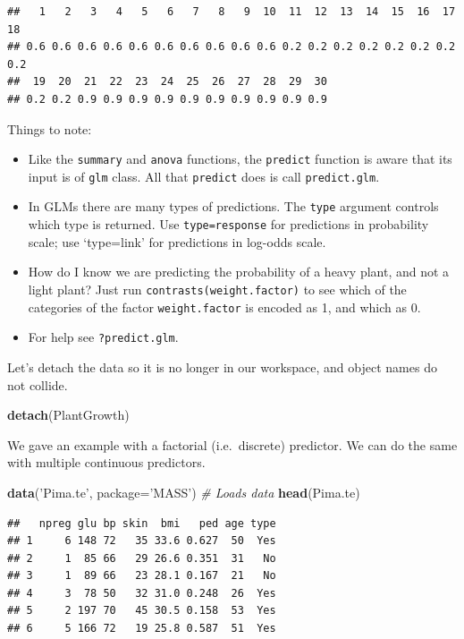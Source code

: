 \documentclass[]{book}
\newenvironment{Shaded}{\begin{snugshade}}{\end{snugshade}}
\newcommand{\KeywordTok}[1]{\textcolor[rgb]{0.13,0.29,0.53}{\textbf{#1}}}
\newcommand{\DataTypeTok}[1]{\textcolor[rgb]{0.13,0.29,0.53}{#1}}
\newcommand{\StringTok}[1]{\textcolor[rgb]{0.31,0.60,0.02}{#1}}
\newcommand{\CommentTok}[1]{\textcolor[rgb]{0.56,0.35,0.01}{\textit{#1}}}
\newcommand{\NormalTok}[1]{#1}
\providecommand{\tightlist}{%
  \setlength{\itemsep}{0pt}\setlength{\parskip}{0pt}}
\theoremstyle{definition}
\theoremstyle{definition}
\theoremstyle{definition}
\theoremstyle{remark}
\begin{document}
\begin{verbatim}
##   1   2   3   4   5   6   7   8   9  10  11  12  13  14  15  16  17  18 
## 0.6 0.6 0.6 0.6 0.6 0.6 0.6 0.6 0.6 0.6 0.2 0.2 0.2 0.2 0.2 0.2 0.2 0.2 
##  19  20  21  22  23  24  25  26  27  28  29  30 
## 0.2 0.2 0.9 0.9 0.9 0.9 0.9 0.9 0.9 0.9 0.9 0.9
\end{verbatim}

Things to note:

\begin{itemize}
\tightlist
\item
  Like the \texttt{summary} and \texttt{anova} functions, the
  \texttt{predict} function is aware that its input is of \texttt{glm}
  class. All that \texttt{predict} does is call \texttt{predict.glm}.
\item
  In GLMs there are many types of predictions. The \texttt{type}
  argument controls which type is returned. Use \texttt{type=response}
  for predictions in probability scale; use `type=link' for predictions
  in log-odds scale.
\item
  How do I know we are predicting the probability of a heavy plant, and
  not a light plant? Just run \texttt{contrasts(weight.factor)} to see
  which of the categories of the factor \texttt{weight.factor} is
  encoded as 1, and which as 0.
\item
  For help see \texttt{?predict.glm}.
\end{itemize}

Let's detach the data so it is no longer in our workspace, and object
names do not collide.

\begin{Shaded}
\begin{Highlighting}[]
\KeywordTok{detach}\NormalTok{(PlantGrowth)}
\end{Highlighting}
\end{Shaded}

We gave an example with a factorial (i.e.~discrete) predictor. We can do
the same with multiple continuous predictors.

\begin{Shaded}
\begin{Highlighting}[]
\KeywordTok{data}\NormalTok{(}\StringTok{'Pima.te'}\NormalTok{, }\DataTypeTok{package=}\StringTok{'MASS'}\NormalTok{) }\CommentTok{# Loads data}
\KeywordTok{head}\NormalTok{(Pima.te)}
\end{Highlighting}
\end{Shaded}

\begin{verbatim}
##   npreg glu bp skin  bmi   ped age type
## 1     6 148 72   35 33.6 0.627  50  Yes
## 2     1  85 66   29 26.6 0.351  31   No
## 3     1  89 66   23 28.1 0.167  21   No
## 4     3  78 50   32 31.0 0.248  26  Yes
## 5     2 197 70   45 30.5 0.158  53  Yes
## 6     5 166 72   19 25.8 0.587  51  Yes
\end{verbatim}
\end{document}

